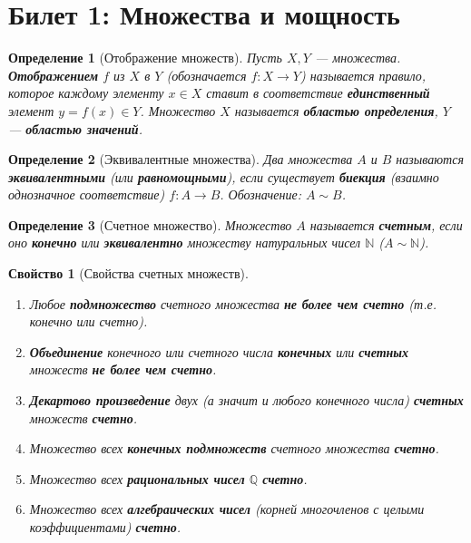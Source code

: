 \documentclass[a4paper, 12pt]{article}
\title{}
\author{}
\date{}
\newtheorem{definition}{Определение}
\newtheorem{property}{Свойство}
\newcommand{\N}{\mathbb{N}}
\newcommand{\Q}{\mathbb{Q}}
\newcommand{\1}{\mathbf{1}}
\begin{document}
\maketitle

\section*{Билет 1: Множества и мощность}
\begin{definition}[Отображение множеств]
    Пусть $X, Y$ — множества. \textbf{Отображением} $f$ из $X$ в $Y$ (обозначается $f: X \to Y$) называется правило, которое каждому элементу $x \in X$ ставит в соответствие \textbf{единственный} элемент $y = f(x) \in Y$. Множество $X$ называется \textbf{областью определения}, $Y$ — \textbf{областью значений}.
\end{definition}

\begin{definition}[Эквивалентные множества]
    Два множества $A$ и $B$ называются \textbf{эквивалентными} (или \textbf{равномощными}), если существует \textbf{биекция} (взаимно однозначное соответствие) $f: A \to B$. Обозначение: $A \sim B$.
\end{definition}

\begin{definition}[Счетное множество]
    Множество $A$ называется \textbf{счетным}, если оно \textbf{конечно} или \textbf{эквивалентно} множеству натуральных чисел $\N$ ($A \sim \N$).
\end{definition}

\begin{property}[Свойства счетных множеств]
    \hfill
    \begin{enumerate}[label=(\arabic*)]
        \item Любое \textbf{подмножество} счетного множества \textbf{не более чем счетно} (т.е. конечно или счетно).
        \item \textbf{Объединение} конечного или счетного числа \textbf{конечных} или \textbf{счетных} множеств \textbf{не более чем счетно}.
        \item \textbf{Декартово произведение} двух (а значит и любого конечного числа) \textbf{счетных} множеств \textbf{счетно}.
        \item Множество всех \textbf{конечных подмножеств} счетного множества \textbf{счетно}.
        \item Множество всех \textbf{рациональных чисел} $\Q$ \textbf{счетно}.
        \item Множество всех \textbf{алгебраических чисел} (корней многочленов с целыми коэффициентами) \textbf{счетно}.
    \end{enumerate}
\end{property}
\end{document}
